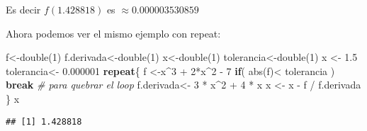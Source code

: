\documentclass[
]{article}
\newenvironment{Shaded}{\begin{snugshade}}{\end{snugshade}}
\newcommand{\CommentTok}[1]{\textcolor[rgb]{0.56,0.35,0.01}{\textit{#1}}}
\newcommand{\ControlFlowTok}[1]{\textcolor[rgb]{0.13,0.29,0.53}{\textbf{#1}}}
\newcommand{\DecValTok}[1]{\textcolor[rgb]{0.00,0.00,0.81}{#1}}
\newcommand{\FloatTok}[1]{\textcolor[rgb]{0.00,0.00,0.81}{#1}}
\newcommand{\FunctionTok}[1]{\textcolor[rgb]{0.00,0.00,0.00}{#1}}
\newcommand{\NormalTok}[1]{#1}
\newcommand{\OtherTok}[1]{\textcolor[rgb]{0.56,0.35,0.01}{#1}}
\newcommand{\SpecialCharTok}[1]{\textcolor[rgb]{0.00,0.00,0.00}{#1}}
\begin{document}
Es decir \(f(1.428818)\) es \(\approx 0.000003530859\)

Ahora podemos ver el mismo ejemplo con repeat:

\begin{Shaded}
\begin{Highlighting}[]
\NormalTok{f}\OtherTok{\textless{}{-}}\FunctionTok{double}\NormalTok{(}\DecValTok{1}\NormalTok{)}
\NormalTok{f.derivada}\OtherTok{\textless{}{-}}\FunctionTok{double}\NormalTok{(}\DecValTok{1}\NormalTok{)}
\NormalTok{x}\OtherTok{\textless{}{-}}\FunctionTok{double}\NormalTok{(}\DecValTok{1}\NormalTok{)}
\NormalTok{tolerancia}\OtherTok{\textless{}{-}}\FunctionTok{double}\NormalTok{(}\DecValTok{1}\NormalTok{)}
\NormalTok{x }\OtherTok{\textless{}{-}} \FloatTok{1.5}
\NormalTok{tolerancia}\OtherTok{\textless{}{-}} \FloatTok{0.000001}
\ControlFlowTok{repeat}\NormalTok{\{}
\NormalTok{  f }\OtherTok{\textless{}{-}}\NormalTok{x}\SpecialCharTok{\^{}}\DecValTok{3} \SpecialCharTok{+} \DecValTok{2}\SpecialCharTok{*}\NormalTok{x}\SpecialCharTok{\^{}}\DecValTok{2} \SpecialCharTok{{-}} \DecValTok{7}
  \ControlFlowTok{if}\NormalTok{( }\FunctionTok{abs}\NormalTok{(f)}\SpecialCharTok{\textless{}}\NormalTok{ tolerancia ) }\ControlFlowTok{break} \CommentTok{\# para quebrar el loop}
\NormalTok{  f.derivada}\OtherTok{\textless{}{-}} \DecValTok{3} \SpecialCharTok{*}\NormalTok{ x}\SpecialCharTok{\^{}}\DecValTok{2}   \SpecialCharTok{+} \DecValTok{4} \SpecialCharTok{*}\NormalTok{ x}
\NormalTok{  x }\OtherTok{\textless{}{-}}\NormalTok{ x }\SpecialCharTok{{-}}\NormalTok{ f }\SpecialCharTok{/}\NormalTok{ f.derivada}
\NormalTok{  \}}
\NormalTok{x}
\end{Highlighting}
\end{Shaded}

\begin{verbatim}
## [1] 1.428818
\end{verbatim}
\end{document}
